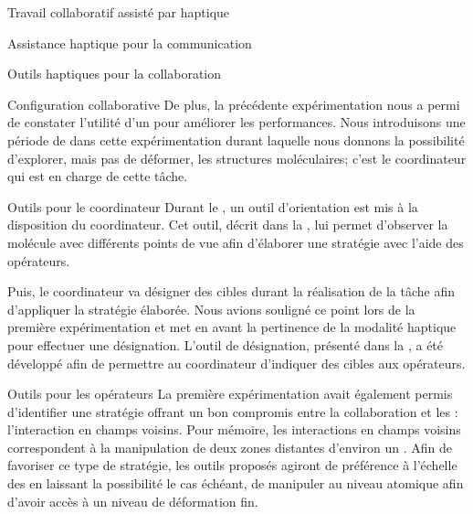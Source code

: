 \documentclass[myfrancais,ngerman,english,french]{mythesis}
\begin{document}
\begin{mychapter}{Travail collaboratif assisté par haptique}
\begin{mysection}{Assistance haptique pour la communication}
\begin{mysubsection}{Outils haptiques pour la collaboration}
\begin{mysubsubsection}{Configuration collaborative}
					De plus, la précédente expérimentation nous a permi de constater l'utilité d'un \mybrainstorming pour améliorer les performances.
					Nous introduisons une période de \mybrainstorming dans cette expérimentation durant laquelle nous donnons la possibilité d'explorer, mais pas de déformer, les structures moléculaires; c'est le coordinateur qui est en charge de cette tâche.
				\end{mysubsubsection}
				\begin{mysubsubsection}{Outils pour le coordinateur}
					Durant le \mybrainstorming, un outil d'orientation est mis à la disposition du coordinateur.
					Cet outil, décrit dans la  , lui permet d'observer la molécule avec différents points de vue afin d'élaborer une stratégie avec l'aide des opérateurs.

					Puis, le coordinateur va désigner des cibles durant la réalisation de la tâche afin d'appliquer la stratégie élaborée.
					Nous avions souligné ce point lors de la première expérimentation et  met en avant la pertinence de la modalité haptique pour effectuer une désignation.
					L'outil de désignation, présenté dans la , a été développé afin de permettre au coordinateur d'indiquer des cibles aux opérateurs.
				\end{mysubsubsection}
				\begin{mysubsubsection}{Outils pour les opérateurs}
					La première expérimentation avait également permis d'identifier une stratégie offrant un bon compromis entre la collaboration et les  : l'interaction en champs voisins.
					Pour mémoire, les interactions en champs voisins correspondent à la manipulation de deux zones distantes d'environ un .
					Afin de favoriser ce type de stratégie, les outils proposés agiront de préférence à l'échelle des  en laissant la possibilité le cas échéant, de manipuler au niveau atomique afin d'avoir accès à un niveau de déformation fin.


\end{mysubsubsection}
\end{mysubsection}
\end{mysection}
\end{mychapter}
\end{document}
